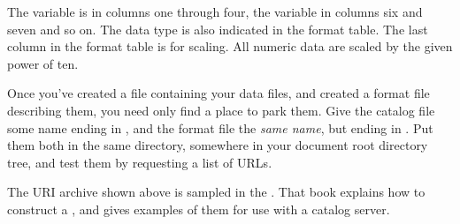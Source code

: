 The  variable is in columns one through four, the
 variable in columns six and seven and so on.  The data
type is also indicated in the format table.  The last column in the
format table is for scaling.  All numeric data are scaled by the given
power of ten.


Once you've created a file containing your data files, and created a
format file describing them, you need only find a place to park them.
Give the catalog file some name ending in , and the format
file the \emph{same name}, but ending in .  Put them both in
the same directory, somewhere in your document root directory tree,
and test them by requesting a list of URLs.

The URI archive shown above is sampled in the \DODSquick .  That book
explains how to construct a , and gives
examples of them for use with a catalog server.

%

